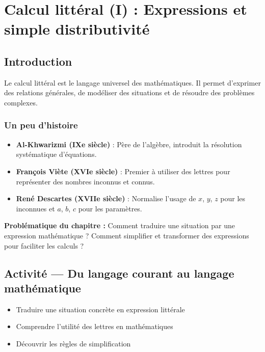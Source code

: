 
\chapter{Calcul littéral (I) : Expressions et simple distributivité}

\section{Introduction}

Le calcul littéral est le langage universel des mathématiques. Il permet d'exprimer des relations générales, de modéliser des situations et de résoudre des problèmes complexes.

\subsection*{Un peu d'histoire}
\begin{itemize}
	\item \textbf{Al-Khwarizmi (IXe siècle)} : Père de l'algèbre, introduit la résolution systématique d'équations.
	\item \textbf{François Viète (XVIe siècle)} : Premier à utiliser des lettres pour représenter des nombres inconnus et connus.
	\item \textbf{René Descartes (XVIIe siècle)} : Normalise l'usage de $x$, $y$, $z$ pour les inconnues et $a$, $b$, $c$ pour les paramètres.
\end{itemize}

\textbf{Problématique du chapitre :} Comment traduire une situation par une expression mathématique ? Comment simplifier et transformer des expressions pour faciliter les calculs ?

\section{Activité — Du langage courant au langage mathématique}

\begin{objectifsbox}
	\begin{itemize}
		\item[\textbullet] Traduire une situation concrète en expression littérale
		\item[\textbullet] Comprendre l'utilité des lettres en mathématiques
		\item[\textbullet] Découvrir les règles de simplification
	\end{itemize}
\end{objectifsbox}

